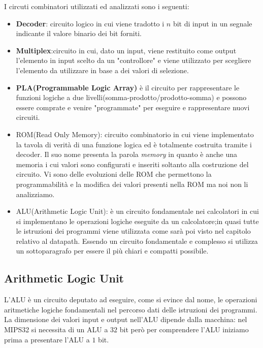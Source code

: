 I circuti combinatori utilizzati ed analizzati sono i seguenti:
\begin{itemize}
  \item \textbf{Decoder}: circuito logico in cui viene tradotto i $n$ bit di input
                        in un segnale indicante il valore binario dei bit forniti.
  \item \textbf{Multiplex}:circuito in cui, dato un input, viene restituito come output
        l'elemento in input scelto da un "controllore" e viene utilizzato
        per scegliere l'elemento da utilizzare in base a dei valori di selezione.
  \item \textbf{PLA(Programmable Logic Array)} è il circuito per rappresentare le funzioni logiche
        a due livelli(somma-prodotto/prodotto-somma) e possono essere comprate e
        venire "programmate" per eseguire e rappresentare nuovi circuiti.
  \item ROM(Read Only Memory): circuito combinatorio in cui viene implementato la tavola
        di verità di una funzione logica ed è totalmente costruita tramite i decoder.
        Il suo nome presenta la parola \emph{memory} in quanto è anche una memoria
        i cui valori sono configurati e inseriti soltanto alla costruzione del circuito.\newline
        Vi sono delle evoluzioni delle ROM che permettono la programmabilità e la
        modifica dei valori presenti nella ROM ma noi non li analizziamo.
  \item ALU(Arithmetic Logic Unit): è un circuito fondamentale nei calcolatori in cui
        si implementano le operazioni logiche eseguite da un calcolatore;in quasi
        tutte le istruzioni dei programmi viene utilizzata come sarà poi visto nel capitolo
        relativo al datapath.\newline
        Essendo un circuito fondamentale e complesso si utilizza un sottoparagrafo
        per essere il più chiari e compatti possibile.
\end{itemize}

\subsection{Arithmetic Logic Unit}
L'ALU è un circuito deputato ad eseguire, come si evince dal nome, le operazioni
aritmetiche logiche fondamentali nel percorso dati delle istruzioni dei programmi.\newline
La dimensione dei valori input e output nell'ALU dipende dalla macchina: nel MIPS32
si necessita di un ALU a $32$ bit però per comprendere l'ALU iniziamo prima a presentare
l'ALU a $1$ bit.


